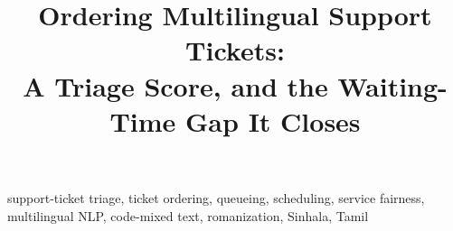 \documentclass[conference,a4paper]{IEEEtran}
\newif\ifblind
\begin{document}
\title{Ordering Multilingual Support Tickets:\\
A Triage Score, and the Waiting-Time Gap It Closes}

\ifblind
  \author{\IEEEauthorblockN{Anonymous Submission}}
\else
  \author{
  }
\fi

\maketitle



\begin{IEEEkeywords}
support-ticket triage, ticket ordering, queueing, scheduling, service fairness,
multilingual NLP, code-mixed text, romanization, Sinhala, Tamil
\end{IEEEkeywords}
















\end{document}
